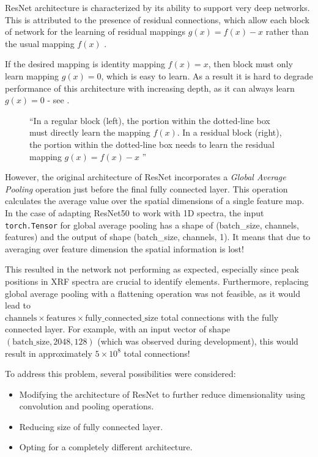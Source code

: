 ResNet architecture is characterized by its ability to support very deep networks. This is attributed to the presence of residual connections, which allow each block of network for the learning of residual mappings $g(x) = f(x) - x$ rather than the usual mapping $f(x)$ \cite{d2lResnet}. 

If the desired mapping is identity mapping $f(x) = x$, then block must only learn mapping $g(x) = 0$, which is easy to learn. 
As a result it is hard to degrade performance of this architecture with increasing depth, as it can always learn $g(x) = 0$ - see .

\begin{figure}[h] 
  \centering     
   
  \caption{``In a regular block (left), the portion within the dotted-line box must directly learn the mapping $f(x)$. 
  In a residual block (right), the portion within the dotted-line box needs to learn the residual mapping $g(x) = f(x) - x$ \cite{d2lResnet}''}
  \label{fig:residual-block}
\end{figure}

However, the original architecture of ResNet incorporates a \emph{Global Average Pooling} operation just before the final fully connected layer. 
This operation calculates the average value over the spatial dimensions of a single feature map. 
In the case of adapting ResNet50 to work with 1D spectra, the input \texttt{torch.Tensor} for global average pooling has a shape of (batch\_size, channels, features) and the output of shape (batch\_size, channels, 1). 
It means that due to averaging over feature dimension the spatial information is lost!

This resulted in the network not performing as expected, especially since peak positions in XRF spectra are crucial to identify elements. 
Furthermore, replacing global average pooling with a flattening operation was not feasible, as it would lead to \\ $\text{{channels}} \times \text{{features}} \times \text{{fully\_connected\_size}}$ total connections with the fully connected layer. 
For example, with an input vector of shape $(\text{{batch\_size}}, 2048, 128)$ (which was observed during development), this would result in approximately $5 \times 10^{8}$ total connections!

To address this problem, several possibilities were considered:
\begin{itemize}
    \item Modifying the architecture of ResNet to further reduce dimensionality using convolution and pooling operations.
    \item Reducing size of fully connected layer.
    \item Opting for a completely different architecture.
\end{itemize}

